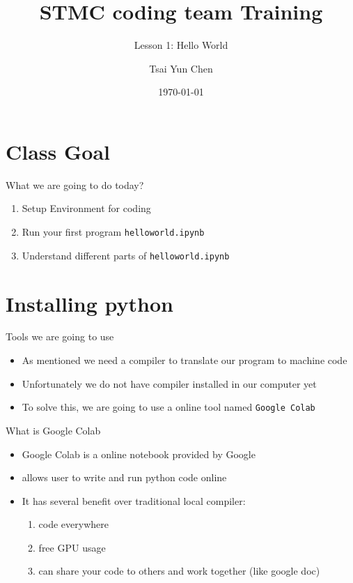 \documentclass[10pt,xcolor={table,dvipsnames},t]{beamer}
\title[Your Short Title]{STMC coding team Training}
\subtitle{Lesson 1: Hello World}
\author{Tsai Yun Chen}
\date{\today}
\begin{document}
\begin{frame}
  \titlepage
\end{frame}


\section{Class Goal}

\begin{frame}{What we are going to do today?}

\begin{enumerate}
  \item Setup Environment for coding
  \item Run your first program \texttt{helloworld.ipynb}
  \item Understand different parts of \texttt{helloworld.ipynb}
\end{enumerate}

\end{frame}

\section{Installing python}

\begin{frame}{Tools we are going to use}
  \begin{itemize}
    \item As mentioned we need a compiler to translate our program to machine code
    \item Unfortunately we do not have compiler installed in our computer yet
    \item To solve this, we are going to use a online tool named \texttt{Google Colab}
  \end{itemize}
\end{frame}

\begin{frame}{What is Google Colab}
  \begin{itemize}
    \item Google Colab is a online notebook provided by Google
    \item allows user to write and run python code online
    \item It has several benefit over traditional local compiler:
    \begin{enumerate}
      \item code everywhere
      \item free GPU usage
      \item can share your code to others and work together (like google doc)
    \end{enumerate}
  \end{itemize}
\end{frame}
\end{document}
